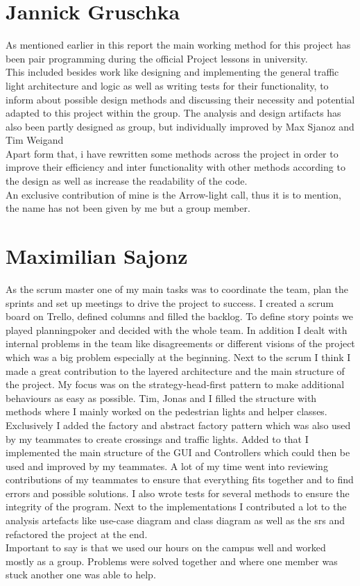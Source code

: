 \documentclass{report}
\begin{document}
    \section{Jannick Gruschka}
    As mentioned earlier in this report the main working method for this project has been pair programming during the official Project lessons in university.\\
    This included besides work like designing and implementing the general traffic light architecture and logic as well as writing tests for their functionality, to inform about possible design methods and discussing their necessity and potential adapted to this project within the group. The analysis and design artifacts has also been partly designed as group, but individually improved by Max Sjanoz and Tim Weigand \\
    Apart form that, i have rewritten some methods across the project in order to improve their efficiency and inter functionality with other methods according to the design as well as increase the readability of the code.\\
    An exclusive contribution of mine is the Arrow-light call, thus it is to mention, the name has not been given by me but a group member.

    \section{Maximilian Sajonz}
    As the scrum master one of my main tasks was to coordinate the team, plan the sprints and set up meetings to drive the project to success.
    I created a scrum board on Trello, defined columns and filled the backlog. To define story points we played planningpoker and decided with the whole team.
    In addition I dealt with internal problems in the team like disagreements or different visions of the project which was a big problem especially at the beginning.
    Next to the scrum I think I made a great contribution to the layered architecture and the main structure of the project. My focus was on the strategy-head-first pattern to make additional behaviours as easy as possible. Tim, Jonas and I filled the structure with methods where I mainly worked on the pedestrian lights and helper classes. Exclusively I added the factory and abstract factory pattern which was also used by my teammates to create crossings and traffic lights. Added to that I implemented the main structure of the GUI and Controllers which could then be used and improved by my teammates. A lot of my time went into reviewing contributions of my teammates to ensure that everything fits together and to find errors and possible solutions. I also wrote tests for several methods to ensure the integrity of the program.
    Next to the implementations I contributed a lot to the analysis artefacts like use-case diagram and class diagram as well as the srs and refactored the project at the end.\\
    Important to say is that we used our hours on the campus well and worked mostly as a group. Problems were solved together and where one member was stuck another one was able to help.\\
\end{document}
